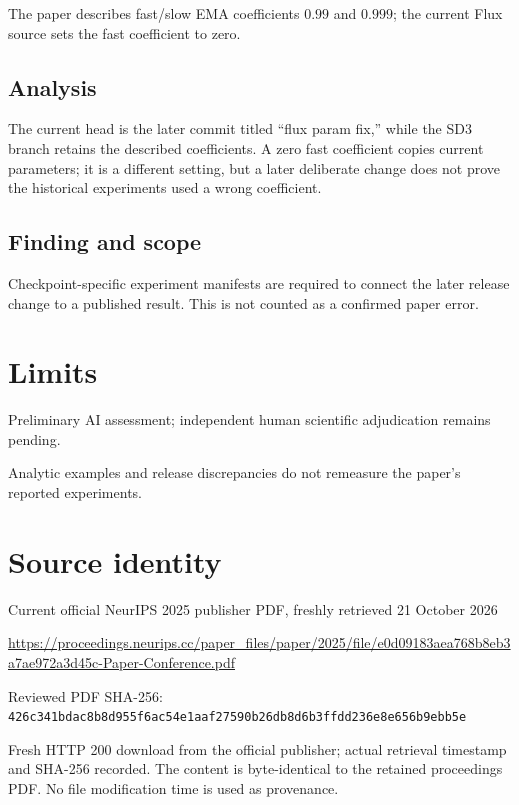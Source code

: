 \documentclass[11pt]{article}
\begin{document}
The paper describes fast/slow EMA coefficients \(0.99\) and \(0.999\); the current Flux source sets the fast coefficient to zero.

\subsection*{Analysis}

The current head is the later commit titled “flux param fix,” while the SD3 branch retains the described coefficients. A zero fast coefficient copies current parameters; it is a different setting, but a later deliberate change does not prove the historical experiments used a wrong coefficient.

\subsection*{Finding and scope}

Checkpoint-specific experiment manifests are required to connect the later release change to a published result. This is not counted as a confirmed paper error.

\section*{Limits}

Preliminary AI assessment; independent human scientific adjudication remains pending.\par

Analytic examples and release discrepancies do not remeasure the paper’s reported experiments.\par

\section*{Source identity}

Current official NeurIPS 2025 publisher PDF, freshly retrieved 21 October 2026

\url{https://proceedings.neurips.cc/paper_files/paper/2025/file/e0d09183aea768b8eb3a7ae972a3d45c-Paper-Conference.pdf}

Reviewed PDF SHA-256: \nolinkurl{426c341bdac8b8d955f6ac54e1aaf27590b26db8d6b3ffdd236e8e656b9ebb5e}

Fresh HTTP 200 download from the official publisher; actual retrieval timestamp and SHA-256 recorded. The content is byte-identical to the retained proceedings PDF. No file modification time is used as provenance.
\end{document}
